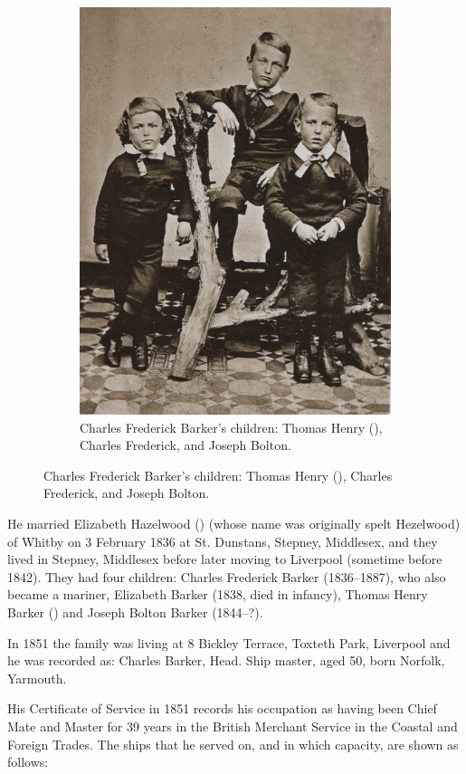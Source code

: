\begin{figure}
\begin{subfigure}{.48\textwidth}
		\includegraphics{photos/CFB_children.png}
		\caption{Charles Frederick Barker's children: Thomas Henry (), Charles Frederick, and Joseph Bolton.}
	\end{subfigure}
\end{figure}

He married Elizabeth Hazelwood () (whose name was originally spelt Hezelwood) of Whitby on 3 February 1836 at St. Dunstans, Stepney, Middlesex, and they lived in Stepney, Middlesex before later moving to Liverpool (sometime before 1842). They had four children: Charles Frederick Barker (1836--1887), who also became a mariner, Elizabeth Barker (1838, died in infancy), Thomas Henry Barker () and Joseph Bolton Barker (1844--?).\cite{CFB1851}

In 1851 the family was living at 8 Bickley Terrace, Toxteth Park, Liverpool and he was recorded as:
Charles Barker, Head. Ship master, aged 50, born Norfolk, Yarmouth.\cite{CFB1851}

His Certificate of Service in 1851 records his occupation as having been Chief Mate and Master for 39 years in the British Merchant Service in the Coastal and Foreign Trades. The ships that he served on, and in which capacity, are shown as follows:

